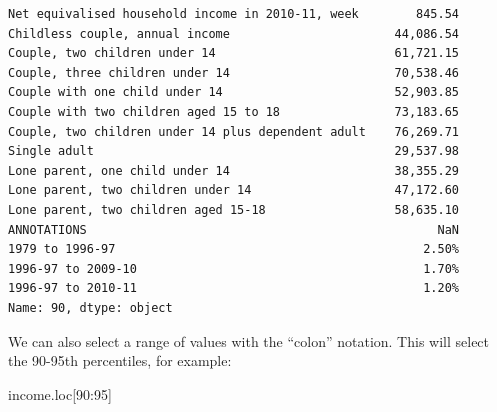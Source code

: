 \documentclass[
  letterpaper,
  DIV=11,
  numbers=noendperiod]{scrreprt}
\newenvironment{Shaded}{\begin{snugshade}}{\end{snugshade}}
\newcommand{\DecValTok}[1]{\textcolor[rgb]{0.68,0.00,0.00}{#1}}
\newcommand{\NormalTok}[1]{\textcolor[rgb]{0.00,0.23,0.31}{#1}}
\begin{document}
\begin{verbatim}
Net equivalised household income in 2010-11, week        845.54
Childless couple, annual income                       44,086.54
Couple, two children under 14                         61,721.15
Couple, three children under 14                       70,538.46
Couple with one child under 14                        52,903.85
Couple with two children aged 15 to 18                73,183.65
Couple, two children under 14 plus dependent adult    76,269.71
Single adult                                          29,537.98
Lone parent, one child under 14                       38,355.29
Lone parent, two children under 14                    47,172.60
Lone parent, two children aged 15-18                  58,635.10
ANNOTATIONS                                                 NaN
1979 to 1996-97                                           2.50%
1996-97 to 2009-10                                        1.70%
1996-97 to 2010-11                                        1.20%
Name: 90, dtype: object
\end{verbatim}

We can also select a range of values with the ``colon'' notation. This
will select the 90-95th percentiles, for example:

\begin{Shaded}
\begin{Highlighting}[]
\NormalTok{income.loc[}\DecValTok{90}\NormalTok{:}\DecValTok{95}\NormalTok{]}
\end{Highlighting}
\end{Shaded}
\end{document}
